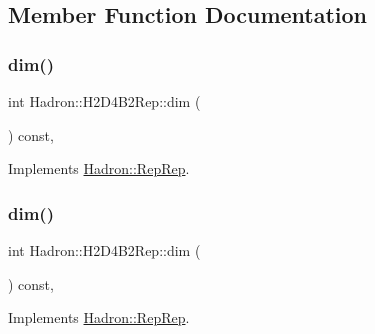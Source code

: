 \subsection{Member Function Documentation}
\mbox{\label{structHadron_1_1H2D4B2Rep_a90884e34cded0501eed13e3083564c1d}} 
\subsubsection{\texorpdfstring{dim()}{dim()}\hspace{0.1cm}{\footnotesize\ttfamily [1/5]}}
{\footnotesize\ttfamily int Hadron\+::\+H2\+D4\+B2\+Rep\+::dim (\begin{DoxyParamCaption}{ }\end{DoxyParamCaption}) const\hspace{0.3cm}{\ttfamily [inline]}, {\ttfamily [virtual]}}



Implements \mbox{\hyperlink{structHadron_1_1RepRep_a92c8802e5ed7afd7da43ccfd5b7cd92b}{Hadron\+::\+Rep\+Rep}}.

\mbox{\label{structHadron_1_1H2D4B2Rep_a90884e34cded0501eed13e3083564c1d}} 
\subsubsection{\texorpdfstring{dim()}{dim()}\hspace{0.1cm}{\footnotesize\ttfamily [2/5]}}
{\footnotesize\ttfamily int Hadron\+::\+H2\+D4\+B2\+Rep\+::dim (\begin{DoxyParamCaption}{ }\end{DoxyParamCaption}) const\hspace{0.3cm}{\ttfamily [inline]}, {\ttfamily [virtual]}}



Implements \mbox{\hyperlink{structHadron_1_1RepRep_a92c8802e5ed7afd7da43ccfd5b7cd92b}{Hadron\+::\+Rep\+Rep}}.

\mbox{\label{structHadron_1_1H2D4B2Rep_a90884e34cded0501eed13e3083564c1d}} 

